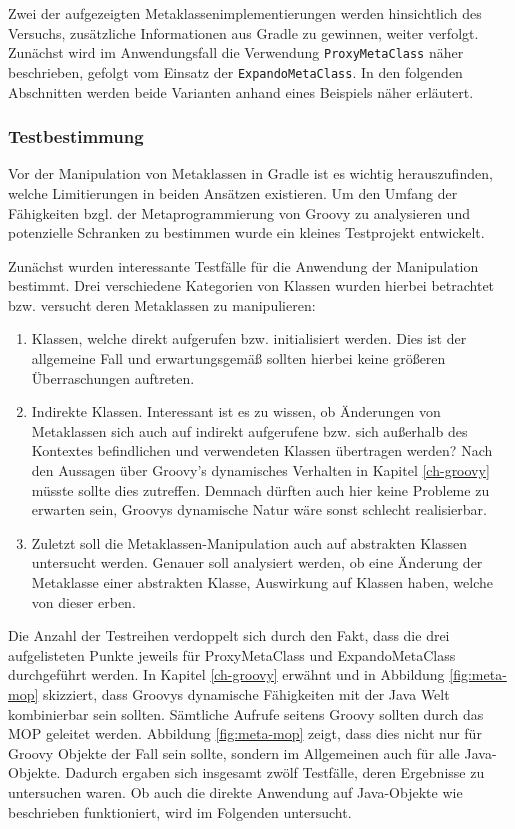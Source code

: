 Zwei der aufgezeigten Metaklassenimplementierungen werden hinsichtlich des Versuchs, zusätzliche Informationen aus Gradle zu gewinnen, weiter verfolgt. 
Zunächst wird im Anwendungsfall die Verwendung \texttt{ProxyMetaClass} näher beschrieben, gefolgt vom Einsatz der \texttt{ExpandoMetaClass}. 
In den folgenden Abschnitten werden beide Varianten anhand eines Beispiels näher erläutert.


\subsubsection{Testbestimmung}
\label{meta-run-test}
Vor der Manipulation von Metaklassen in Gradle ist es wichtig herauszufinden, welche Limitierungen in beiden Ansätzen existieren.
Um den Umfang der Fähigkeiten bzgl. der Metaprogrammierung von Groovy zu analysieren und potenzielle Schranken zu bestimmen wurde ein kleines Testprojekt entwickelt.

Zunächst wurden interessante Testfälle für die Anwendung der Manipulation bestimmt. 
Drei verschiedene Kategorien von Klassen wurden hierbei betrachtet bzw. versucht deren Metaklassen zu manipulieren:


\begin{enumerate}
	\item Klassen, welche direkt aufgerufen bzw. initialisiert werden. 
	Dies ist der allgemeine Fall und erwartungsgemäß sollten hierbei keine größeren Überraschungen auftreten.
	
	\item Indirekte Klassen. 
	Interessant ist es zu wissen, ob Änderungen von Metaklassen sich auch auf indirekt aufgerufene bzw. sich außerhalb des Kontextes befindlichen und verwendeten Klassen übertragen werden? 
	Nach den Aussagen über Groovy's dynamisches Verhalten in Kapitel \ref{ch-groovy} müsste sollte dies zutreffen.
	Demnach dürften auch hier keine Probleme zu erwarten sein, Groovys dynamische Natur wäre sonst schlecht realisierbar.
	
	\item Zuletzt soll die Metaklassen-Manipulation auch auf abstrakten Klassen untersucht werden. 
	Genauer soll analysiert werden, ob eine Änderung der Metaklasse einer abstrakten Klasse, Auswirkung auf Klassen haben, welche von dieser erben.
\end{enumerate}


Die Anzahl der Testreihen verdoppelt sich durch den Fakt, dass die drei aufgelisteten Punkte jeweils für ProxyMetaClass und ExpandoMetaClass durchgeführt werden. 
In Kapitel \ref{ch-groovy} erwähnt und in Abbildung \ref{fig:meta-mop} skizziert, dass Groovys dynamische Fähigkeiten mit der Java Welt kombinierbar sein sollten. 
Sämtliche Aufrufe seitens Groovy sollten durch das MOP geleitet werden. 
Abbildung \ref{fig:meta-mop} zeigt, dass dies nicht nur für Groovy Objekte der Fall sein sollte, sondern im Allgemeinen auch für alle Java-Objekte. 
Dadurch ergaben sich insgesamt zwölf Testfälle, deren Ergebnisse zu untersuchen waren. 
Ob auch die direkte Anwendung auf Java-Objekte wie beschrieben funktioniert, wird im Folgenden untersucht.


